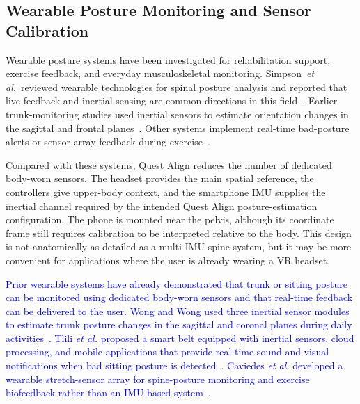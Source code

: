 \documentclass[conference]{IEEEtran}
\newcommand{\CC}[1]{\textcolor{blue}{#1}}
\begin{document}
\subsection{Wearable Posture Monitoring and Sensor Calibration}
Wearable posture systems have been investigated for rehabilitation support, exercise
feedback, and everyday musculoskeletal monitoring. Simpson~\textit{et al.}~reviewed
wearable technologies for spinal posture analysis and reported that live feedback and
inertial sensing are common directions in this field~\cite{wearablesreview}. Earlier
trunk-monitoring studies used inertial sensors to estimate orientation changes in the
sagittal and frontal planes~\cite{trunk_monitoring}. Other systems implement real-time
bad-posture alerts or sensor-array feedback during exercise~\cite{realtime_posture,sensor_array}.

Compared with these systems, Quest Align reduces the number of dedicated body-worn sensors.
The headset provides the main spatial reference, the controllers give upper-body context,
and the smartphone IMU supplies the inertial channel required by the intended Quest Align
posture-estimation configuration. The phone is mounted near the pelvis, although its coordinate
frame still requires calibration to be interpreted relative to the body. This design is not
anatomically as detailed as a multi-IMU spine system, but it may be more convenient for
applications where the user is already wearing a VR headset.

\CC{Prior wearable systems have already demonstrated that trunk or sitting posture can be
monitored using dedicated body-worn sensors and that real-time feedback can be delivered to
the user. Wong and Wong used three inertial sensor modules to estimate trunk posture changes
in the sagittal and coronal planes during daily activities~\cite{trunk_monitoring}. Tlili
\textit{et al.} proposed a smart belt equipped with inertial sensors, cloud processing, and
mobile applications that provide real-time sound and visual notifications when bad sitting
posture is detected~\cite{realtime_posture}. Caviedes \textit{et al.} developed a wearable
stretch-sensor array for spine-posture monitoring and exercise biofeedback rather than an
IMU-based system~\cite{sensor_array}.}
\end{document}
